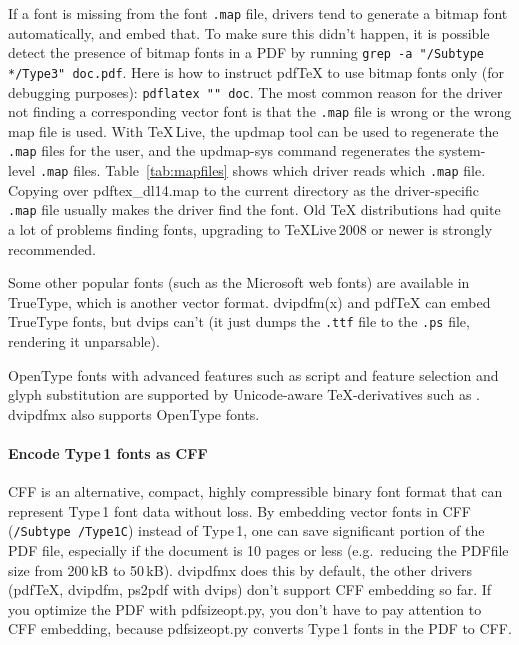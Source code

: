 \documentclass{ltugproc}
\def\cmd{\textsf}
\def\pkg{\textsf}
\begin{document}
If a font is missing from the font \texttt{.map} file, drivers tend to
generate a bitmap font automatically, and embed that. To make sure this
didn't happen, it is possible detect the presence of bitmap fonts in a PDF
by running \texttt{grep -a "/Subtype */Type3" doc.pdf}. Here is how to
instruct pdf\TeX{} to use bitmap fonts only (for debugging purposes):
\texttt{pdflatex "\string\pdfmapfile{}\string" doc}.
The most common
reason for the driver not finding a corresponding vector font is that the
\texttt{.map} file is wrong or the wrong map file is used. With
\TeX{}\,Live, the \cmd{updmap} tool can be used to regenerate the
\texttt{.map} files for the user, and the \cmd{updmap-sys} command
regenerates the system-level \texttt{.map} files. Table~\ref{tab:mapfiles}
shows which driver reads which \texttt{.map} file. Copying over
\pkg{pdftex\_dl14.map} to the current directory as the driver-specific
\texttt{.map} file
usually makes the driver find the font. Old \TeX{} distributions had quite
a lot of problems finding fonts, upgrading to \TeX{}Live\,2008 or newer is
strongly recommended.

Some other popular fonts (such as the Microsoft web fonts) are available in
TrueType, which is another vector format. \cmd{dvipdfm(x)} and pdf\TeX{} can
embed TrueType fonts, but \cmd{dvips} can't (it just dumps the
\texttt{.ttf} file to the \texttt{.ps} file, rendering it unparsable).

OpenType fonts with advanced features such as script and feature selection
and glyph substitution are supported by Unicode-aware \TeX{}-derivatives
such as \XeTeX{}. \cmd{dvipdfmx} also supports OpenType fonts.

\paragraph{Encode Type\,1 fonts as CFF}

CFF \cite{cff} is an alternative, compact, highly compressible binary font
format that can represent Type\,1 font data without loss. By embedding
vector fonts in CFF (\texttt{/Subtype /Type1C}) instead of Type\,1, one can
save significant portion of the PDF file, especially if the document is 10
pages or less (e.g.\ reducing the PDFfile size from 200\,kB to 50\,kB).
\cmd{dvipdfmx} does this by default, the other drivers (pdf\TeX{},
\cmd{dvipdfm}, \cmd{ps2pdf} with \cmd{dvips}) don't support CFF embedding so
far. If you optimize the PDF with \cmd{pdfsizeopt.py}, you don't have to pay
attention to CFF embedding, because \cmd{pdfsizeopt.py} converts Type\,1
fonts in the PDF to CFF.
\end{document}
